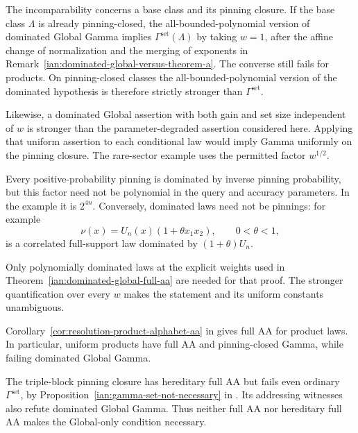 \begin{remark}
\label{ian:dominated-global-comparison-scope}
The incomparability concerns a base class and its pinning closure.
If the base class \(\Lambda\) is already pinning-closed, the
all-bounded-polynomial version of dominated Global Gamma implies
\(\Gamma^{\mathrm{set}}(\Lambda)\) by taking \(w=1\), after the affine
change of normalization and the merging of exponents in
Remark~\ref{ian:dominated-global-versus-theorem-a}. The converse still
fails for products. On pinning-closed classes the all-bounded-polynomial
version of the dominated hypothesis is therefore strictly stronger than
\(\Gamma^{\mathrm{set}}\).

Likewise, a dominated Global assertion with both gain and set size
independent of \(w\) is stronger than the parameter-degraded
assertion considered here. Applying that uniform assertion to each
conditional law would imply Gamma uniformly on the pinning closure.
The rare-sector example uses the permitted factor \(w^{1/2}\).

Every positive-probability pinning is dominated by inverse pinning
probability, but this factor need not be polynomial in the query
and accuracy parameters. In the example it is \(2^{4n}\).
Conversely, dominated laws need not be pinnings: for example
\[
 \nu(x)=U_n(x)(1+\theta x_1x_2),\qquad 0<\theta<1,
\]
is a correlated full-support law dominated by \((1+\theta)U_n\).

Only polynomially dominated laws at the explicit weights used in
Theorem~\ref{ian:dominated-global-full-aa} are needed for that proof.
The stronger quantification over every \(w\) makes the statement and
its uniform constants unambiguous.
\end{remark}

\begin{remark}
\label{ian:dominated-global-not-necessary}
Corollary~\ref{cor:resolution-product-alphabet-aa} in
 gives full AA for product laws.
In particular, uniform products have full AA and pinning-closed Gamma,
while failing dominated Global Gamma.

The triple-block pinning closure has hereditary full AA but fails
even ordinary \(\Gamma^{\mathrm{set}}\), by
Proposition~\ref{ian:gamma-set-not-necessary} in
.
Its addressing witnesses also refute dominated Global Gamma.
Thus neither full AA nor hereditary full AA makes the
Global-only condition necessary.
\end{remark}

